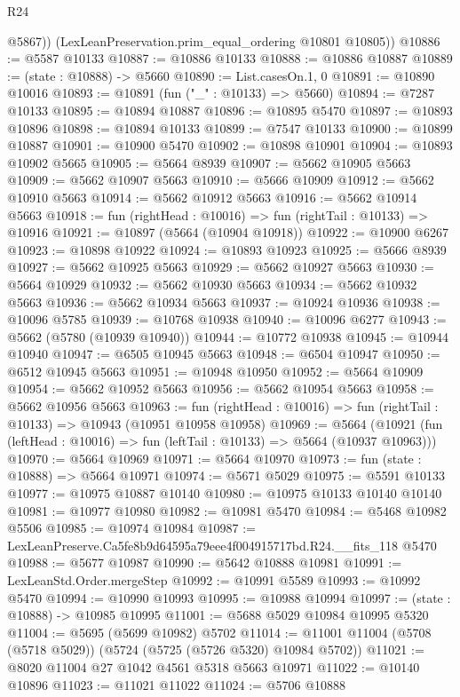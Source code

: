 \begin{lexlean}{R24}
\begin{coremodule}
          @5867))
      (LexLeanPreservation.prim_equal_ordering @10801 @10805))
@10886 := @5587 @10133
@10887 := @10886 @10133
@10888 := @10886 @10887
@10889 := (state : @10888) -> @5660
@10890 := List.casesOn.{1, 0}
@10891 := @10890 @10016
@10893 := @10891 (fun ("_" : @10133) => @5660)
@10894 := @7287 @10133
@10895 := @10894 @10887
@10896 := @10895 @5470
@10897 := @10893 @10896
@10898 := @10894 @10133
@10899 := @7547 @10133
@10900 := @10899 @10887
@10901 := @10900 @5470
@10902 := @10898 @10901
@10904 := @10893 @10902 @5665
@10905 := @5664 @8939
@10907 := @5662 @10905 @5663
@10909 := @5662 @10907 @5663
@10910 := @5666 @10909
@10912 := @5662 @10910 @5663
@10914 := @5662 @10912 @5663
@10916 := @5662 @10914 @5663
@10918 := fun (rightHead : @10016) => fun (rightTail : @10133) => @10916
@10921 := @10897 (@5664 (@10904 @10918))
@10922 := @10900 @6267
@10923 := @10898 @10922
@10924 := @10893 @10923
@10925 := @5666 @8939
@10927 := @5662 @10925 @5663
@10929 := @5662 @10927 @5663
@10930 := @5664 @10929
@10932 := @5662 @10930 @5663
@10934 := @5662 @10932 @5663
@10936 := @5662 @10934 @5663
@10937 := @10924 @10936
@10938 := @10096 @5785
@10939 := @10768 @10938
@10940 := @10096 @6277
@10943 := @5662 (@5780 (@10939 @10940))
@10944 := @10772 @10938
@10945 := @10944 @10940
@10947 := @6505 @10945 @5663
@10948 := @6504 @10947
@10950 := @6512 @10945 @5663
@10951 := @10948 @10950
@10952 := @5664 @10909
@10954 := @5662 @10952 @5663
@10956 := @5662 @10954 @5663
@10958 := @5662 @10956 @5663
@10963 := fun (rightHead : @10016) => fun (rightTail : @10133) => @10943 (@10951 @10958 @10958)
@10969 := @5664
    (@10921 (fun (leftHead : @10016) => fun (leftTail : @10133) => @5664 (@10937 @10963)))
@10970 := @5664 @10969
@10971 := @5664 @10970
@10973 := fun (state : @10888) => @5664 @10971
@10974 := @5671 @5029
@10975 := @5591 @10133
@10977 := @10975 @10887 @10140
@10980 := @10975 @10133 @10140 @10140
@10981 := @10977 @10980
@10982 := @10981 @5470
@10984 := @5468 @10982 @5506
@10985 := @10974 @10984
@10987 := LexLeanPreserve.Ca5fe8b9d64595a79eee4f004915717bd.R24.__fits_118 @5470
@10988 := @5677 @10987
@10990 := @5642 @10888 @10981
@10991 := LexLeanStd.Order.mergeStep
@10992 := @10991 @5589
@10993 := @10992 @5470
@10994 := @10990 @10993
@10995 := @10988 @10994
@10997 := (state : @10888) -> @10985 @10995
@11001 := @5688 @5029 @10984 @10995 @5320
@11004 := @5695 (@5699 @10982) @5702
@11014 := @11001 @11004 (@5708 (@5718 @5029)) (@5724 (@5725 (@5726 @5320) @10984 @5702))
@11021 := @8020 @11004 @27 @1042 @4561 @5318 @5663 @10971
@11022 := @10140 @10896
@11023 := @11021 @11022
@11024 := @5706 @10888

\end{coremodule}
\end{lexlean}
